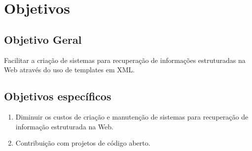 \chapter{Objetivos}

\section{Objetivo Geral}

Facilitar a criação de sistemas para recuperação de informações estruturadas na Web através do uso de templates em XML.

\section{Objetivos específicos}

\begin{enumerate}
	\item Diminuir os custos de criação e manutenção de sistemas para recuperação de informação estruturada na Web.
	\item Contribuição com projetos de código aberto.
\end{enumerate}